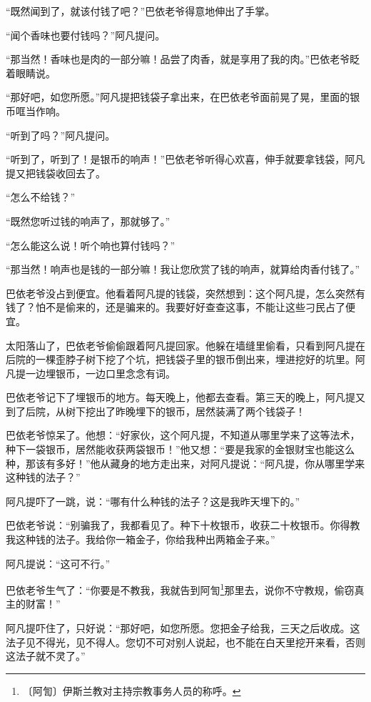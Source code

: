 \documentclass[12pt,UTF-8,openany]{ctexbook}
\begin{document}
\begin{large}
    “既然闻到了，就该付钱了吧？”巴依老爷得意地伸出了手掌。
    
    “闻个香味也要付钱吗？”阿凡提问。
    
    “那当然！香味也是肉的一部分嘛！品尝了肉香，就是享用了我的肉。”巴依老爷眨着眼睛说。
    
    “那好吧，如您所愿。”阿凡提把钱袋子拿出来，在巴依老爷面前晃了晃，里面的银币哐当作响。
    
    “听到了吗？”阿凡提问。
    
    “听到了，听到了！是银币的响声！”巴依老爷听得心欢喜，伸手就要拿钱袋，阿凡提又把钱袋收回去了。
    
    “怎么不给钱？”
    
    “既然您听过钱的响声了，那就够了。”
    
    “怎么能这么说！听个响也算付钱吗？”
    
    “那当然！响声也是钱的一部分嘛！我让您欣赏了钱的响声，就算给肉香付钱了。”
    
    巴依老爷没占到便宜。他看着阿凡提的钱袋，突然想到：这个阿凡提，怎么突然有钱了？怕不是偷来的，还是骗来的。我要好好查查这事，不能让这些刁民占了便宜。
    
    太阳落山了，巴依老爷偷偷跟着阿凡提回家。他躲在墙缝里偷看，只看到阿凡提在后院的一棵歪脖子树下挖了个坑，把钱袋子里的银币倒出来，埋进挖好的坑里。阿凡提一边埋银币，一边口里念念有词。
    
    巴依老爷记下了埋银币的地方。每天晚上，他都去查看。第三天的晚上，阿凡提又到了后院，从树下挖出了昨晚埋下的银币，居然装满了两个钱袋子！
    
    巴依老爷惊呆了。他想：“好家伙，这个阿凡提，不知道从哪里学来了这等法术，种下一袋银币，居然能收获两袋银币！”他又想：“要是我家的金银财宝也能这么种，那该有多好！”他从藏身的地方走出来，对阿凡提说：“阿凡提，你从哪里学来这种钱的法子？”
    
    阿凡提吓了一跳，说：“哪有什么种钱的法子？这是我昨天埋下的。”
    
    巴依老爷说：“别骗我了，我都看见了。种下十枚银币，收获二十枚银币。你得教我这种钱的法子。我给你一箱金子，你给我种出两箱金子来。”
    
    阿凡提说：“这可不行。”
    
    巴依老爷生气了：“你要是不教我，我就告到阿訇\footnote{〔阿訇〕伊斯兰教对主持宗教事务人员的称呼。}那里去，说你不守教规，偷窃真主的财富！”
    
    阿凡提吓住了，只好说：“那好吧，如您所愿。您把金子给我，三天之后收成。这法子见不得光，见不得人。您切不可对别人说起，也不能在白天里挖开来看，否则这法子就不灵了。”
    

\end{large}
\end{document}

